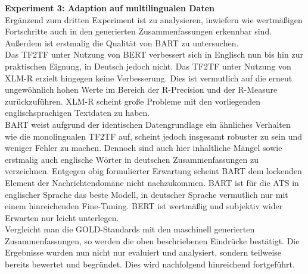 \noindent
\textbf{Experiment 3: Adaption auf multilingualen Daten}\\
\noindent
Ergänzend zum dritten Experiment ist zu analysieren, inwiefern wie wertmäßigen Fortschritte auch in den generierten Zusammenfassungen erkennbar sind. Außerdem ist erstmalig die Qualität von \ac{BART} zu untersuchen.\\

\noindent
Das \ac{TF2TF} unter Nutzung von \ac{BERT} verbessert sich in Englisch nun bis hin zur praktischen Eignung, in Deutsch jedoch nicht. Das \ac{TF2TF} unter Nutzung von \ac{XLM-R} erzielt hingegen keine Verbesserung. Dies ist vermutlich auf die erneut ungewöhnlich hohen Werte im Bereich der R-Precision und der R-Measure zurückzuführen. \ac{XLM-R} scheint große Probleme mit den vorliegenden englischsprachigen Textdaten zu haben.\\

\noindent
\ac{BART} weist aufgrund der identischen Datengrundlage ein ähnliches Verhalten wie die monolingualen \ac{TF2TF} auf, scheint jedoch insgesamt robuster zu sein und weniger Fehler zu machen. Dennoch sind auch hier inhaltliche Mängel sowie erstmalig auch englische Wörter in deutschen Zusammenfassungen zu verzeichnen. Entgegen obig formulierter Erwartung scheint \ac{BART} dem lockenden Element der Nachrichtendomäne nicht nachzukommen. \ac{BART} ist für die \ac{ATS} in englischer Sprache das beste Modell, in deutscher Sprache vermutlich nur mit einem hinreichenden Fine-Tuning. \ac{BERT} ist wertmäßig und subjektiv wider Erwarten nur leicht unterlegen.\\

\noindent
Vergleicht man die GOLD-Standards mit den maschinell generierten Zusammenfassungen, so werden die oben beschriebenen Eindrücke bestätigt. Die Ergebnisse wurden nun nicht nur evaluiert und analysiert, sondern teilweise bereits bewertet und begründet. Dies wird nachfolgend hinreichend fortgeführt.
